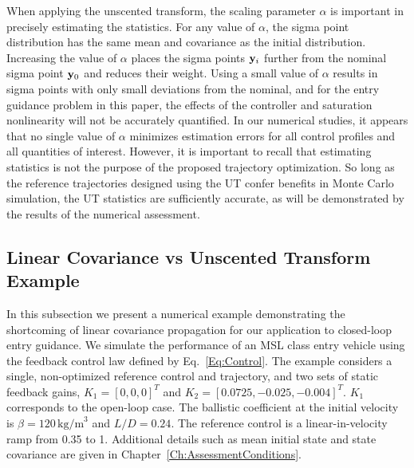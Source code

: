 When applying the unscented transform, the scaling parameter $\alpha$ is important in precisely estimating the statistics. For any value of $\alpha$, the sigma point distribution has the same mean and covariance as the initial distribution. Increasing the value of $\alpha$ places the sigma points $\mathbf{y}_i$ further from the nominal sigma point $\mathbf{y}_0$ and reduces their weight. Using a small value of $\alpha$ results in sigma points with only small deviations from the nominal, and for the entry guidance problem in this paper, the effects of the controller and saturation nonlinearity will not be accurately quantified. In our numerical studies, it appears that no single value of $\alpha$ minimizes estimation errors for all control profiles and all quantities of interest. However, it is important to recall that estimating statistics is not the purpose of the proposed trajectory optimization. So long as the reference trajectories designed using the UT confer benefits in Monte Carlo simulation, the UT statistics are sufficiently accurate, as will be demonstrated by the results of the numerical assessment. 

\subsection{Linear Covariance vs Unscented Transform Example}\label{Subsec:UQExample}
In this subsection we present a numerical example demonstrating the shortcoming of linear covariance propagation for our application to closed-loop entry guidance.
We simulate the performance of an MSL class entry vehicle using the feedback control law defined by Eq.~\eqref{Eq:Control}. The example considers a single, non-optimized reference control and trajectory, and two sets of static feedback gains, $K_1=[0,0,0]^T$ and $K_2=[0.0725, -0.025, -0.004]^T$. $K_1$ corresponds to the open-loop case. The ballistic coefficient at the initial velocity is $\beta=120\,\mathrm{kg/m}^3$ and $L/D = 0.24$. The reference control is a linear-in-velocity ramp from 0.35 to 1. Additional details such as mean initial state and state covariance are given in Chapter~\ref{Ch:AssessmentConditions}.

